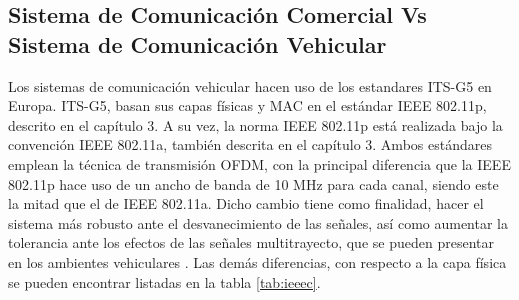 \subsection{Sistema de Comunicación Comercial Vs Sistema de Comunicación Vehicular}

Los sistemas de comunicación vehicular hacen uso de los estandares ITS-G5 en Europa. ITS-G5, basan sus capas físicas y MAC en el estándar IEEE 802.11p, descrito en el capítulo 3. A su vez, la norma IEEE 802.11p está realizada bajo la convención IEEE 802.11a, también descrita en el capítulo 3. Ambos estándares emplean la técnica de transmisión OFDM, con la principal diferencia que la IEEE 802.11p hace uso de un ancho de banda de 10 MHz para cada canal, siendo este la mitad que el de IEEE 802.11a. Dicho cambio tiene como finalidad, hacer el sistema más robusto ante el desvanecimiento de las señales, así como aumentar la tolerancia ante los efectos de las señales multitrayecto, que se pueden presentar en los ambientes vehiculares \cite{lin2010comparison}. Las demás diferencias, con respecto a la capa física se pueden encontrar listadas en la tabla \ref{tab:ieeec}.\\   


\begin{table}[htbp]
  \centering
{}%
\caption{Comparación entre las capas físicas de los estándares IEEE 802.11p e IEEE 802.11a}
  \label{tab:ieeec}%
\end{table}%

